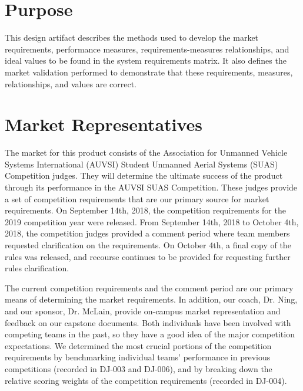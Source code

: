 \documentclass[]{auvsi_doc}
\begin{document}
\begin{AUVSITitlePage}

\begin{artifacttable}
\end{artifacttable}

\end{AUVSITitlePage}

\section{Purpose}

This design artifact describes the methods used to develop the market requirements, performance measures, requirements-measures relationships, and ideal values to be found in the system requirements matrix. It also defines the market validation performed to demonstrate that these requirements, measures, relationships, and values are correct.

\section{Market Representatives}
The market for this product consists of the Association for Unmanned Vehicle Systems International (AUVSI) Student Unmanned Aerial Systems (SUAS) Competition judges.
They will determine the ultimate success of the product through its performance in the AUVSI SUAS Competition.
These judges provide a set of competition requirements that are our primary source for market requirements.
On September 14th, 2018, the competition requirements for the 2019 competition year were released.
From September 14th, 2018 to October 4th, 2018, the competition judges provided a comment period where team members requested clarification on the requirements. On October 4th, a final copy of the rules was released, and recourse continues to be provided for requesting further rules clarification.

The current competition requirements and the comment period are our primary means of determining the market requirements.
In addition, our coach, Dr. Ning, and our sponsor, Dr. McLain, provide on-campus market representation and feedback on our capstone documents. Both individuals have been involved with competing teams in the past, so they have a good idea of the major competition expectations.
We determined the most crucial portions of the competition requirements by benchmarking individual teams' performance in previous competitions (recorded in DJ-003 and DJ-006), and by breaking down the relative scoring weights of the competition requirements (recorded in DJ-004). 
\end{document}

